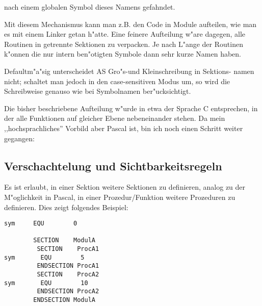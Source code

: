 \documentclass[12pt,a4paper,twoside]{report}
\begin{document}
{\begin{itemize}
{      nach einem globalen Symbol dieses Namens gefahndet.}
\end{itemize}
Mit diesem Mechanismus kann man z.B. den Code in Module aufteilen, wie man
es mit einem Linker getan h"atte.  Eine feinere Aufteilung w"are dagegen,
alle Routinen in getrennte Sektionen zu verpacken.  Je nach L"ange der
Routinen k"onnen die nur intern ben"otigten Symbole dann sehr kurze Namen
haben.
\par
Defaultm"a"sig unterscheidet AS Gro"s-und Kleinschreibung in Sektions-
namen nicht; schaltet man jedoch in den case-sensitiven Modus um, so
wird die Schreibweise genauso wie bei Symbolnamen ber"ucksichtigt.
\par
Die bisher beschriebene Aufteilung w"urde in etwa der Sprache C entsprechen,
in der alle Funktionen auf gleicher Ebene nebeneinander stehen.  Da mein
,,hochsprachliches'' Vorbild aber Pascal ist, bin ich noch einen Schritt
weiter gegangen:


\subsection{Verschachtelung und Sichtbarkeitsregeln}

Es ist erlaubt, in einer Sektion weitere Sektionen zu definieren, analog
zu der M"oglichkeit in Pascal, in einer Prozedur/Funktion weitere
Prozeduren zu definieren.  Dies zeigt folgendes Beispiel:
\begin{verbatim}
sym     EQU        0

        SECTION    ModulA
         SECTION    ProcA1
sym       EQU        5
         ENDSECTION ProcA1
         SECTION    ProcA2
sym       EQU        10
         ENDSECTION ProcA2
        ENDSECTION ModulA


\end{verbatim}}
\end{document}
